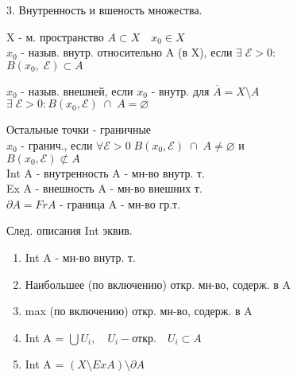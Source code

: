 \documentclass[11pt, fleqn]{article}
\begin{document}
    \begin{question}{3. Внутренность и вшеность множества.}
        \begin{definition}
            X - м. пространство $A \subset X \quad x_0 \in X$\\
            $x_0$ - назыв. внутр. относительно A (в X), если $\exists \; \mathcal{E} > 0:$\\
            $B(x_0, \; \mathcal{E}) \subset A$
        \end{definition}

        \begin{definition}
            $x_0$ - назыв. внешней, если $x_0$ - внутр. для $\overline{A} = X \setminus A$\\
            $\exists \; \mathcal{E} > 0 : B(x_0, \mathcal{E}) \; \cap \; A = \varnothing$
        \end{definition}

        \begin{definition}
            Остальные точки - граничные\\
            $x_0$ - гранич., если $\forall \mathcal{E} > 0 \; B(x_0, \mathcal{E}) \; \cap \; A \neq \varnothing$ и\\
            $B(x_0, \mathcal{E}) \not\subset A$\\
            Int A - внутренность A - мн-во внутр. т.\\
            Ex A - внешность A - мн-во внешних т.\\
            $\partial A = Fr A$ - граница A - мн-во гр.т.
        \end{definition}

        \begin{theorem}
            След. описания Int эквив.\\
            \begin{enumerate}
                \item Int A - мн-во внутр. т.
                \item Наибольшее (по включению) откр. мн-во, содерж. в A
                \item max (по включению) откр. мн-во, содерж. в A
                \item Int A = $\bigcup U_i, \quad U_i - \text{откр.} \quad U_i \subset A$
                \item Int A = $(X \setminus Ex A) \setminus \partial A$
            \end{enumerate}
        \end{theorem}


\end{question}
\end{document}
